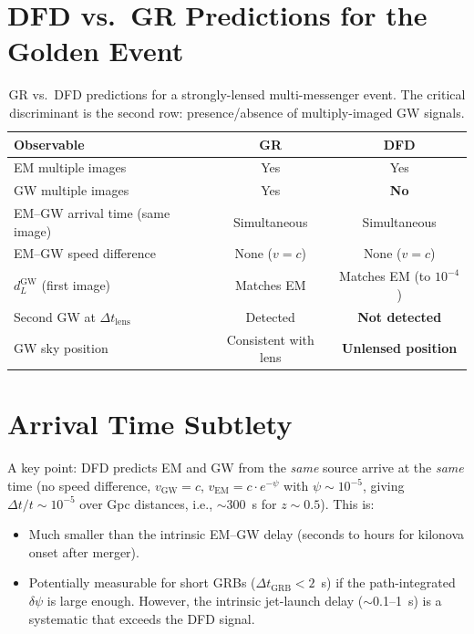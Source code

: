 \documentclass[11pt]{article}
\theoremstyle{definition}
\theoremstyle{remark}
\begin{document}
\section{DFD vs.\ GR Predictions for the Golden Event}

\begin{table}[H]
\centering
\begin{tabular}{@{}lcc@{}}
\toprule
Observable & GR & DFD \\
\midrule
EM multiple images & Yes & Yes \\
GW multiple images & Yes & \textbf{No} \\
EM--GW arrival time (same image) & Simultaneous & Simultaneous \\
EM--GW speed difference & None ($v = c$) & None ($v = c$) \\
$d_L^{\mathrm{GW}}$ (first image) & Matches EM & Matches EM (to $10^{-4}$) \\
Second GW at $\Delta t_{\mathrm{lens}}$ & Detected & \textbf{Not detected} \\
GW sky position & Consistent with lens & \textbf{Unlensed position} \\
\bottomrule
\end{tabular}
\caption{GR vs.\ DFD predictions for a strongly-lensed multi-messenger
event. The critical discriminant is the second row: presence/absence of
multiply-imaged GW signals.}
\label{tab:golden}
\end{table}

\section{Arrival Time Subtlety}

A key point: DFD predicts EM and GW from the \emph{same} source arrive
at the \emph{same} time (no speed difference, $v_{\mathrm{GW}} = c$,
$v_{\mathrm{EM}} = c \cdot e^{-\psi}$ with $\psi \sim 10^{-5}$, giving
$\Delta t / t \sim 10^{-5}$ over Gpc distances, i.e., $\sim$300~s for
$z \sim 0.5$). This is:
\begin{itemize}[nosep]
\item Much smaller than the intrinsic EM--GW delay (seconds to hours for
  kilonova onset after merger).
\item Potentially measurable for short GRBs ($\Delta t_{\mathrm{GRB}}
  < 2$~s) if the path-integrated $\delta\psi$ is large enough. However,
  the intrinsic jet-launch delay ($\sim$0.1--1~s) is a systematic that
  exceeds the DFD signal.
\end{itemize}
\end{document}
